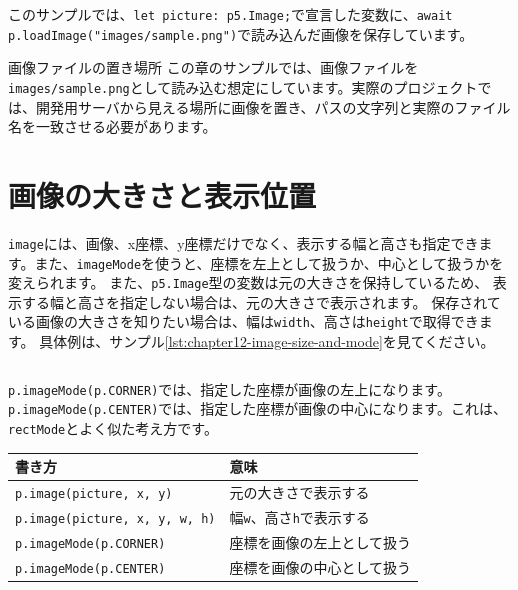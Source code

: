 \begin{listing}[htbp]
\inputminted{ts}{typescript-p5/listings/chapter12/load-image-basic.ts}
\caption{\texttt{loadImage}関数で画像を読み込んで表示する（\texttt{chapter12/load-image-basic.ts}）}
\label{lst:chapter12-load-image-basic}
\end{listing}

このサンプルでは、\texttt{let picture: p5.Image;}で宣言した変数に、\texttt{await p.loadImage("images/sample.png")}で読み込んだ画像を保存しています。

\begin{notebox}{画像ファイルの置き場所}
この章のサンプルでは、画像ファイルを\texttt{images/sample.png}として読み込む想定にしています。実際のプロジェクトでは、開発用サーバから見える場所に画像を置き、パスの文字列と実際のファイル名を一致させる必要があります。
\end{notebox}

\section{画像の大きさと表示位置}

\texttt{image}には、画像、x座標、y座標だけでなく、表示する幅と高さも指定できます。また、\texttt{imageMode}を使うと、座標を左上として扱うか、中心として扱うかを変えられます。
また、\texttt{p5.Image}型の変数は元の大きさを保持しているため、
表示する幅と高さを指定しない場合は、元の大きさで表示されます。
保存されている画像の大きさを知りたい場合は、幅は\texttt{width}、高さは\texttt{height}で取得できます。
具体例は、サンプル\ref{lst:chapter12-image-size-and-mode}を見てください。

\begin{listing}[htbp]
\inputminted{ts}{typescript-p5/listings/chapter12/image-size-and-mode.ts}
\caption{\texttt{imageMode}と表示サイズを指定する（\texttt{chapter12/image-size-and-mode.ts}）}
\label{lst:chapter12-image-size-and-mode}
\end{listing}

\texttt{p.imageMode(p.CORNER)}では、指定した座標が画像の左上になります。\texttt{p.imageMode(p.CENTER)}では、指定した座標が画像の中心になります。これは、\texttt{rectMode}とよく似た考え方です。

\begin{center}
\begin{tabular}{ll}
\toprule
書き方 & 意味 \\
\midrule
\texttt{p.image(picture, x, y)} & 元の大きさで表示する \\
\texttt{p.image(picture, x, y, w, h)} & 幅\texttt{w}、高さ\texttt{h}で表示する \\
\texttt{p.imageMode(p.CORNER)} & 座標を画像の左上として扱う \\
\texttt{p.imageMode(p.CENTER)} & 座標を画像の中心として扱う \\
\bottomrule
\end{tabular}
\end{center}

